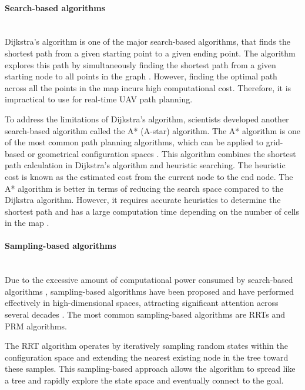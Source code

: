 \documentclass[12pt, a4paper]{article}
\begin{document}
\paragraph{Search-based algorithms} ~\\
Dijkstra's algorithm is one of the major search-based algorithms, that finds the
shortest path from a given starting point to a given ending point. The algorithm
explores this path by simultaneously finding the shortest path from a given
starting node to all points in the graph \cite{javaid2013understanding}.
However, finding the optimal path across all the points in the map incurs high
computational cost. Therefore, it is impractical to use for real-time UAV path
planning. 

To address the limitations of Dijkstra’s algorithm, scientists developed another
search-based algorithm called the A* (A-star) algorithm. The A* algorithm is one of
the most common path planning algorithms, which can be applied to grid-based or
geometrical configuration spaces \cite{Astar_simulation}. This algorithm
combines the shortest path calculation in Dijkstra’s algorithm and heuristic
searching. The heuristic cost is known as the estimated cost from the current
node to the end node. The A* algorithm is better in terms of reducing the search
space compared to the Dijkstra algorithm. However, it requires accurate
heuristics to determine the shortest path and has a large computation time
depending on the number of cells in the map \cite{DUCHON201459}.  

\paragraph{Sampling-based algorithms} ~\\
Due to the excessive amount of computational power consumed by search-based
algorithms \cite{karaman2011samplingbasedalgorithmsoptimalmotion}, sampling-based
algorithms have been proposed and have performed effectively in high-dimensional
spaces, attracting significant attention across several decades
\cite{Kavraki, kavraki_etal}. The most common sampling-based algorithms are
RRTs and PRM algorithms.

The RRT algorithm operates by iteratively sampling random states within the
configuration space and extending the nearest existing node in the tree toward
these samples. This sampling-based approach allows the algorithm to spread like a
tree and rapidly explore the state space and eventually connect to the goal. 
\end{document}
